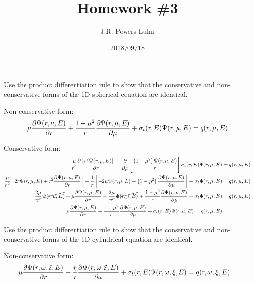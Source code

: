 \documentclass{hw}
\author{J.R. Powers-Luhn}
\date{2018/09/18}
\title{Homework \#3}
\begin{document}
\problem{}
    Use the product differentiation rule to show that the conservative and non-conservative forms of the 1D spherical equation are identical.

\solution
    Non-conservative form:
    \begin{align*}
    	\mu \pdv{\Psi (r, \mu, E)}{r} + \frac{1-\mu^2}{r} \pdv{\Psi (r, \mu, E)}{\mu} +\sigma_t(r, E) \Psi (r, \mu, E) = q(r, \mu, E)
    \end{align*}

    Conservative form:
    \begin{align*}
    	\frac{\mu}{r^2} \pdv{\left[ r^2 \Psi(r, \mu, E) \right]}{r} + \pdv{}{\mu} \left[ \frac{\left( 1 - \mu^2 \right) \Psi(r, \mu, E)}{r} \right]
    		\sigma_t (r, E) \Psi ( r, \mu, E ) &= q(r, \mu, E) \\
    	\frac{\mu}{r^2} \left[ 2 r \Psi ( r, \mu, E ) + r^2 \pdv{\Psi ( r, \mu, E )}{r} \right] + 
    		\frac{1}{r} \left[ -2 \mu \Psi ( r, \mu, E ) + \left( 1 - \mu^2 \right) \pdv{\Psi ( r, \mu, E )}{\mu} \right] + 
    		\sigma_t \Psi ( r, \mu, E ) &= q(r, \mu, E) \\
    	\cancel{\frac{2 \mu}{r} \Psi ( r, \mu, E )} + \mu \pdv{\Psi ( r, \mu, E )}{r} - \cancel{\frac{2 \mu}{r} \Psi ( r, \mu, E )} +
    		\frac{1 - \mu^2}{r} \pdv{\Psi ( r, \mu, E )}{\mu} + \sigma_t \Psi ( r, \mu, E ) &= q(r, \mu, E) \\
    	\mu \pdv{\Psi (r, \mu, E)}{r} + \frac{1-\mu^2}{r} \pdv{\Psi (r, \mu, E)}{\mu} +\sigma_t(r, E) \Psi (r, \mu, E) = q(r, \mu, E)
    \end{align*}

\problem{}
    Use the product differentiation rule to show that the conservative and non-conservative forms of the 1D cylindrical equation are identical.

\solution
    Non-conservative form:
    \begin{align*}
    	\mu \pdv{\Psi( r, \omega, \xi, E )}{r} - \frac{\eta}{r} \pdv{\Psi( r, \omega, \xi, E )}{\omega} + \sigma_t(r, E) \Psi( r, \omega, \xi, E ) &= q(r, \omega, \xi, E)
    \end{align*}
\end{document}
